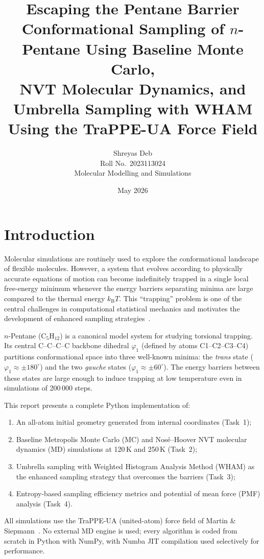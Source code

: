 \documentclass[12pt,a4paper]{article}
\title{%
  \textbf{Escaping the Pentane Barrier}\\[0.4em]
  \large Conformational Sampling of $n$-Pentane Using Baseline Monte Carlo,\\
  NVT Molecular Dynamics, and Umbrella Sampling with WHAM\\[0.3em]
  \normalsize Using the TraPPE-UA Force Field
}
\author{Shreyas Deb \\ \small Roll No.\ 2023113024 \\ \small Molecular Modelling and Simulations}
\date{May 2026}
\begin{document}
\maketitle
\tableofcontents
\newpage

\section{Introduction}
\label{sec:intro}

Molecular simulations are routinely used to explore the conformational
landscape of flexible molecules.  However, a system that evolves according to
physically accurate equations of motion can become indefinitely trapped in a
single local free-energy minimum whenever the energy barriers separating
minima are large compared to the thermal energy $k_{\mathrm{B}}T$.  This
``trapping'' problem is one of the central challenges in computational
statistical mechanics and motivates the development of enhanced sampling
strategies~\citep{Frenkel2002}.

$n$-Pentane (C$_5$H$_{12}$) is a canonical model system for studying
torsional trapping.  Its central C--C--C--C backbone dihedral $\varphi_1$
(defined by atoms C1--C2--C3--C4) partitions conformational space into three
well-known minima: the \emph{trans} state ($\varphi_1 \approx \pm 180^{\circ}$)
and the two \emph{gauche} states ($\varphi_1 \approx \pm 60^{\circ}$).  The
energy barriers between these states are large enough to induce trapping at
low temperature even in simulations of 200\,000 steps.

This report presents a complete Python implementation of:
\begin{enumerate}
  \item An all-atom initial geometry generated from internal coordinates
        (Task~1);
  \item Baseline Metropolis Monte Carlo (MC) and Nos\'{e}--Hoover NVT
        molecular dynamics (MD) simulations at 120\,K and 250\,K
        (Task~2);
  \item Umbrella sampling with Weighted Histogram Analysis Method (WHAM)
        as the enhanced sampling strategy that overcomes the barriers
        (Task~3);
  \item Entropy-based sampling efficiency metrics and potential of mean
        force (PMF) analysis (Task~4).
\end{enumerate}

All simulations use the TraPPE-UA (united-atom) force field of Martin \&
Siepmann~\citeyear{Martin1998}.  No external MD engine is used; every
algorithm is coded from scratch in Python with NumPy, with Numba JIT
compilation used selectively for performance.
\end{document}
